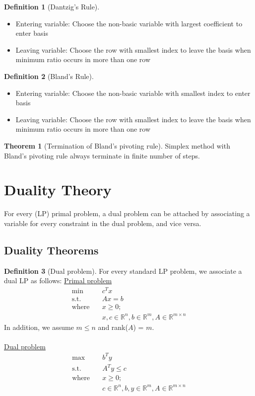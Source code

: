 \documentclass{article}
\theoremstyle{definition}
\newtheorem{theorem}{Theorem}[section]
\newtheorem{definition}{Definition}[section]
\begin{document}
	\begin{definition}[Dantzig's Rule]\hfill
		\begin{itemize}
			\item Entering variable: Choose the non-basic variable with largest coefficient to enter basis
			\item Leaving variable: Choose the row with smallest index to leave the basis when minimum ratio occurs in more than one row
		\end{itemize}
	\end{definition}

	\begin{definition}[Bland's Rule]\hfill
		\begin{itemize}
			\item Entering variable: Choose the non-basic variable with smallest index to enter basis
			\item Leaving variable: Choose the row with smallest index to leave the basis when minimum ratio occurs in more than one row
		\end{itemize}
	\end{definition}

	\begin{theorem}[Termination of Bland's pivoting rule]\hfill\break
		Simplex method with Bland's pivoting rule always terminate in finite number of steps.
	\end{theorem}

    \break
	\section{Duality Theory}
	For every (LP) primal problem, a dual problem can be attached by associating a variable for every constraint in the dual problem, and vice versa.
    
    \subsection{Duality Theorems}
	\begin{definition}[Dual problem]\hfill
	For every standard LP problem, we associate a dual LP as follows:
	\underline{Primal problem}
	\begin{align*}	
		\text{min} \quad& c^T x \\
		\text{s.t.} \quad& Ax = b \\
		\text{where} \quad& x \geq 0;\\
		&x, c \in \mathbb{R}^n, b \in \mathbb{R}^m, A \in \mathbb{R}^{m\times n}
	\end{align*}
	In addition, we assume $m \leq n$ and rank($A$) = $m$.\\\\
	\underline{Dual problem}
	\begin{align*}	
		\text{max} \quad& b^T y \\
		\text{s.t.} \quad& A^Ty \leq c \\
		\text{where} \quad& x \geq 0;\\
		&c \in \mathbb{R}^n, b,y \in \mathbb{R}^m, A \in \mathbb{R}^{m\times n}
	\end{align*}
	\end{definition}
\end{document}
